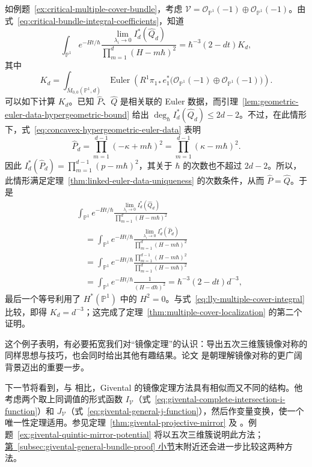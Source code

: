 \begin{example}\label{ex:lly-multiple-cover-proof}
如例题~\ref{ex:critical-multiple-cover-bundle}，考虑 $\mathcal V=\mathcal O_{\mathbb P^1}(-1)\oplus\mathcal O_{\mathbb P^1}(-1)$。由式~\eqref{eq:critical-bundle-integral-coefficients}，知道
\begin{equation}\label{eq:lly-multiple-cover-integral}
\int_{\mathbb P^1}e^{-Ht/\hbar}
\frac{\lim_{\lambda_i\to0}I_d^*(\widehat Q_d)}{\prod_{m=1}^d(H-m\hbar)^2}
=\hbar^{-3}(2-dt)K_d,
\end{equation}
其中
\[
K_d=\int_{\overline M_{0,0}(\mathbb P^1,d)}
\operatorname{Euler}\!\left(R^1\pi_{1*}e_1^*
\bigl(\mathcal O_{\mathbb P^1}(-1)\oplus\mathcal O_{\mathbb P^1}(-1)\bigr)\right).
\]
可以如下计算 $K_d$。已知 $\widehat P$、$\widehat Q$ 是相关联的 Euler 数据，而引理~\ref{lem:geometric-euler-data-hypergeometric-bound} 给出 $\deg_{\hbar}I_d^*(\widehat Q_d)\le2d-2$。不过，在此情形下，式~\eqref{eq:concavex-hypergeometric-euler-data} 表明
\[
\widehat P_d=\prod_{m=1}^{d-1}(-\kappa+m\hbar)^2
=\prod_{m=1}^{d-1}(\kappa-m\hbar)^2.
\]
因此 $I_d^*(\widehat P_d)=\prod_{m=1}^{d-1}(p-m\hbar)^2$，其关于 $\hbar$ 的次数也不超过 $2d-2$。所以，此情形满足定理~\ref{thm:linked-euler-data-uniqueness} 的次数条件，从而 $\widehat P=\widehat Q$。于是
\[
\begin{aligned}
&\int_{\mathbb P^1}e^{-Ht/\hbar}
\frac{\lim_{\lambda_i\to0}I_d^*(\widehat Q_d)}{\prod_{m=1}^d(H-m\hbar)^2}\\
&\quad=\int_{\mathbb P^1}e^{-Ht/\hbar}
\frac{\lim_{\lambda_i\to0}I_d^*(\widehat P_d)}{\prod_{m=1}^d(H-m\hbar)^2}\\
&\quad=\int_{\mathbb P^1}e^{-Ht/\hbar}
\frac{\prod_{m=1}^{d-1}(H-m\hbar)^2}{\prod_{m=1}^d(H-m\hbar)^2}\\
&\quad=\int_{\mathbb P^1}e^{-Ht/\hbar}\frac1{(H-d\hbar)^2}
=\hbar^{-3}(2-dt)d^{-3},
\end{aligned}
\]
最后一个等号利用了 $H^*(\mathbb P^1)$ 中的 $H^2=0$。与式~\eqref{eq:lly-multiple-cover-integral} 比较，即得 $K_d=d^{-3}$；这完成了定理~\ref{thm:multiple-cover-localization} 的第二个证明。
\end{example}

这个例子表明，有必要拓宽我们对“镜像定理”的认识：导出五次三维簇镜像对称的同样思想与技巧，也会同时给出其他有趣结果。论文  是朝理解镜像对称的更广阔背景迈出的重要一步。

下一节将看到，与  相比，Givental 的镜像定理方法具有相似而又不同的结构。他考虑两个取上同调值的形式函数 $I_{\mathcal V}$（式~\eqref{eq:givental-complete-intersection-i-function}）和 $J_{\mathcal V}$（式~\eqref{eq:givental-general-j-function}），然后作变量变换，使一个唯一性定理适用。参见定理~\ref{thm:givental-projective-mirror} 及 。例题~\ref{ex:givental-quintic-mirror-potential} 将以五次三维簇说明此方法；\hyperref[subsec:givental-general-bundle-proof]{第~\ref*{subsec:givental-general-bundle-proof} 小节}末附近还会进一步比较这两种方法。

